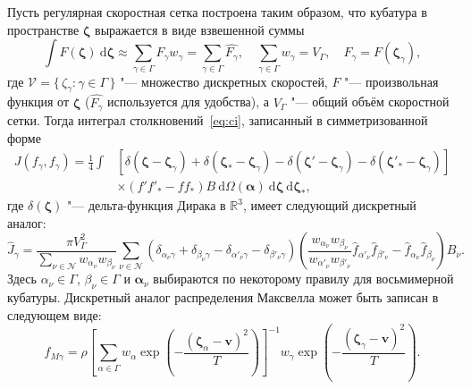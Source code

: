 \documentclass[a4paper,12pt]{article}
\newcommand{\dd}{\:\mathrm{d}}
\newcommand{\dzeta}{\boldsymbol{\dd\zeta}}
\newcommand{\bzeta}{\boldsymbol{\zeta}}
\newcommand{\Nu}{\mathcal{N}}
\newcommand{\Set}[2]{\{\,{#1}:{#2}\,\}}
\begin{document}
Пусть регулярная скоростная сетка построена таким образом,
что кубатура в пространстве \(\bzeta\) выражается в виде взвешенной суммы
\begin{equation}\label{eq:zeta_cubature}
    \int F(\bzeta) \dzeta \approx \sum_{\gamma\in\Gamma} F_\gamma w_\gamma =
        \sum_{\gamma\in\Gamma} \hat{F_\gamma},
        \quad \sum_{\gamma\in\Gamma} w_\gamma = V_\Gamma,
        \quad F_\gamma = F(\bzeta_\gamma),
\end{equation}
где \(\mathcal{V} = \Set{\zeta_\gamma}{\gamma\in\Gamma}\) "--- множество дискретных скоростей,
\(F\) "--- произвольная функция от \(\bzeta\) (\(\hat{F_\gamma}\) используется для удобства),
а \(V_\Gamma\) "--- общий объём скоростной сетки.
Тогда интеграл столкновений~\eqref{eq:ci}, записанный в симметризованной форме
\begin{equation}\label{eq:symm_ci}
    \begin{aligned}
    J(f_\gamma, f_\gamma) = \frac14\int &\left[
        \delta(\bzeta-\bzeta_\gamma) + \delta(\bzeta_*-\bzeta_\gamma)
        - \delta(\bzeta'-\bzeta_\gamma) - \delta(\bzeta'_*-\bzeta_\gamma)\right] \\
        &\times(f'f'_* - ff_*)B \dd\Omega(\boldsymbol{\alpha}) \dzeta\dzeta_*,
    \end{aligned}
\end{equation}
где \(\delta(\bzeta)\) "--- дельта-функция Дирака в \(\mathbb{R}^3\),
имеет следующий дискретный аналог:
\begin{equation}\label{eq:discrete_symm_ci}
    \hat{J}_\gamma = \frac{\pi V_\Gamma^2}{\sum_{\nu\in\Nu} w_{\alpha_\nu}w_{\beta_\nu}}
        \sum_{\nu\in\Nu} \left(
            \delta_{\alpha_\nu\gamma} + \delta_{\beta_\nu\gamma}
            - \delta_{\alpha'_\nu\gamma} - \delta_{\beta'_\nu\gamma}
        \right)\left(
            \frac{w_{\alpha_\nu}w_{\beta_\nu}}{w_{\alpha'_\nu}w_{\beta'_\nu}}
            \hat{f}_{\alpha'_\nu}\hat{f}_{\beta'_\nu} - \hat{f}_{\alpha_\nu}\hat{f}_{\beta_\nu}
        \right)B_\nu.
\end{equation}
Здесь \(\alpha_\nu\in\Gamma\), \(\beta_\nu\in\Gamma\) и \(\boldsymbol{\alpha}_\nu\)
выбираются по некоторому правилу для восьмимерной кубатуры.
Дискретный аналог распределения Максвелла может быть записан в следующем виде:
\begin{equation}\label{eq:discrete_Maxwell}
    \hat{f}_{M\gamma} = \rho\left[\sum_{\alpha\in\Gamma}w_\alpha\exp
            \left(-\frac{(\bzeta_\alpha - \boldsymbol{v})^2}{T}\right)
        \right]^{-1}
        w_\gamma\exp\left(-\frac{(\bzeta_\gamma - \boldsymbol{v})^2}{T}\right).
\end{equation}
\end{document}
